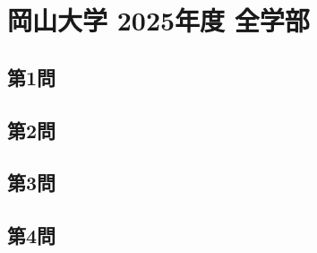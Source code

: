 ﻿\documentclass[../../uem_phy_oka_a.tex]{subfiles}
\begin{document}
    \section{岡山大学 2025年度 全学部}
    \subsection{第1問}
    
    \clearpage
    \subsection{第2問}
    
    \clearpage
    \subsection{第3問}
    
    \clearpage
    \subsection{第4問}
    
\end{document}
